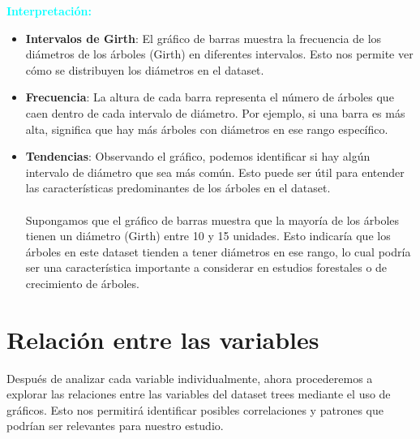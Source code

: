 \documentclass{article}
\begin{document}
\large\textbf{\textcolor{cyan}{Interpretación:}}
\begin{itemize}
        \item \textbf{Intervalos de Girth}: El gráfico de barras muestra la frecuencia de los diámetros de los árboles (Girth) en diferentes intervalos. Esto nos permite ver cómo se distribuyen los diámetros en el dataset.
        \item \textbf{Frecuencia}: La altura de cada barra representa el número de árboles que caen dentro de cada intervalo de diámetro. Por ejemplo, si una barra es más alta, significa que hay más árboles con diámetros en ese rango específico.
        \item \textbf{Tendencias}: Observando el gráfico, podemos identificar si hay algún intervalo de diámetro que sea más común. Esto puede ser útil para entender las características predominantes de los árboles en el dataset.\\  \\Supongamos que el gráfico de barras muestra que la mayoría de los árboles tienen un diámetro (Girth) entre 10 y 15 unidades. Esto indicaría que los árboles en este dataset tienden a tener diámetros en ese rango, lo cual podría ser una característica importante a considerar en estudios forestales o de crecimiento de árboles. 
    \end{itemize}
\section{Relación entre las variables}
Después de analizar cada variable individualmente, ahora procederemos a explorar las relaciones entre las variables del dataset trees mediante el uso de gráficos. Esto nos permitirá identificar posibles correlaciones y patrones que podrían ser relevantes para nuestro estudio.
\end{document}
